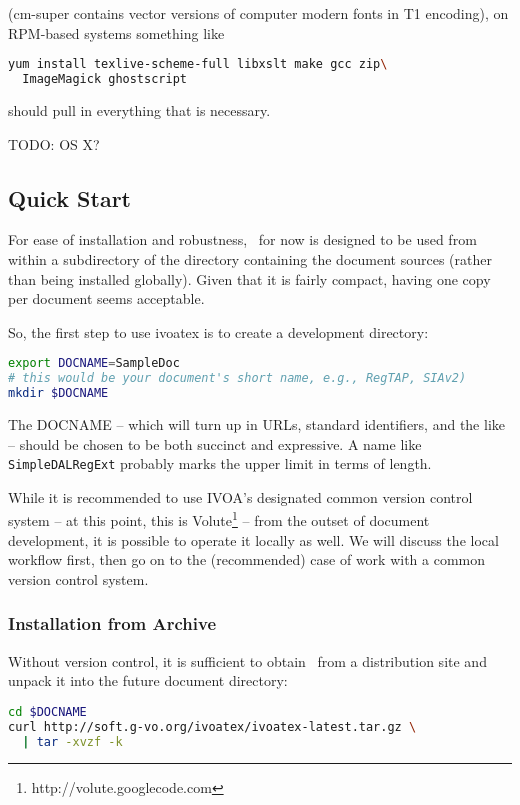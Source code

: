 \documentclass[11pt,a4paper]{ivoa}
\begin{document}
(cm-super contains vector versions of computer modern fonts in T1
encoding), on RPM-based systems something like

\begin{lstlisting}[language=sh]
yum install texlive-scheme-full libxslt make gcc zip\
  ImageMagick ghostscript
\end{lstlisting}

should pull in everything that is necessary.

TODO: OS X?

\subsection{Quick Start}

For ease of installation and robustness, \ivoatex\ for now is designed
to be used from within a subdirectory of the directory containing the
document sources (rather than being installed globally).  Given that
it is fairly compact, having one copy per document seems acceptable.

So, the first step to use ivoatex is to create a development
directory:

\begin{lstlisting}[language=sh]
export DOCNAME=SampleDoc
# this would be your document's short name, e.g., RegTAP, SIAv2)
mkdir $DOCNAME
\end{lstlisting}

The DOCNAME -- which will turn up in URLs, standard identifiers, and the
like -- should be chosen to be both succinct and expressive.  A name
like \texttt{SimpleDALRegExt} probably marks the upper limit in terms of
length.

While it is recommended to use IVOA's designated common version control
system -- at this point, this is
Volute\footnote{http://volute.googlecode.com} -- from the outset of
document development, it is possible to operate it locally as well.  We
will discuss the local workflow first, then go on to the
(recommended) case of work with a common version control system.

\subsubsection{Installation from Archive}

Without version control, it is sufficient to obtain \ivoatex\ from a
distribution site and unpack it into the future document directory:

\begin{lstlisting}[language=sh]
cd $DOCNAME
curl http://soft.g-vo.org/ivoatex/ivoatex-latest.tar.gz \
  | tar -xvzf -k
\end{lstlisting}
\end{document}
